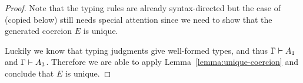 \begin{proof}
  Note that the typing rules are already syntax-directed but the case of
   (copied below) still needs special attention since we
  need to show that the generated coercion $E$ is unique.
  \begin{mathpar}
  \end{mathpar}
  Luckily we know that typing
  judgments give well-formed types, and thus $\jwf \Gamma {A_1}$ and $\jwf
  \Gamma {A_3}$. Therefore we are able to apply
  Lemma~\ref{lemma:unique-coercion} and conclude that $E$ is
  unique.

\end{proof}

